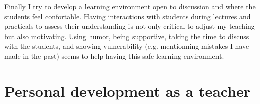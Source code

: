 \documentclass[12pt]{article}
\begin{document}
\bigskip

Finally I try to develop a learning environment open to discussion and
where the students feel confortable. Having interactions with students
during lectures and practicals to assess their understanding is not
only critical to adjust my teaching but also motivating. Using humor,
being supportive, taking the time to discuss with the students, and
showing vulnerability (e.g. mentionning mistakes I have made in the
past) seems to help having this safe learning environment.




\section{Personal development as a teacher}
\label{sec:orge0cb562}
\end{document}
